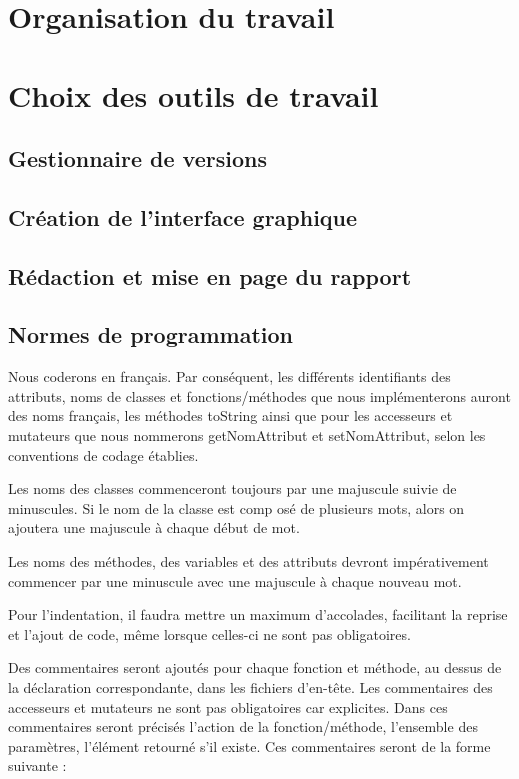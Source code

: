 \documentclass{report}
\begin{document}
\section{Organisation du travail}

\section{Choix des outils de travail}
\subsection{Gestionnaire de versions}
\subsection{Création de l'interface graphique}
\subsection{Rédaction et mise en page du rapport}
\subsection{Normes de programmation}
\hspace{0.5cm}Nous coderons en français. Par conséquent, les différents identifiants des attributs, noms de classes et fonctions/méthodes que nous implémenterons auront des noms français, les méthodes toString ainsi que pour les accesseurs et mutateurs que nous nommerons getNomAttribut et setNomAttribut,
selon les conventions de codage établies.\par

Les noms des classes commenceront toujours par une majuscule suivie de minuscules. Si le nom de la classe est comp osé de plusieurs mots, alors on ajoutera une majuscule à chaque début de mot.\par

Les noms des méthodes, des variables et des attributs devront impérativement commencer par une minuscule avec une majuscule à chaque nouveau mot.\par

Pour l'indentation, il faudra mettre un maximum d'accolades, facilitant la reprise et l'ajout de code, même lorsque celles-ci ne sont pas obligatoires.\par

Des commentaires seront ajoutés pour chaque fonction et méthode, au dessus de la déclaration correspondante, dans les fichiers d'en-tête. Les commentaires des accesseurs et mutateurs ne sont pas obligatoires car explicites.
Dans ces commentaires seront précisés l'action de la fonction/méthode, l'ensemble des paramètres, l'élément retourné s'il existe. Ces commentaires seront de la forme suivante : \par
\end{document}
